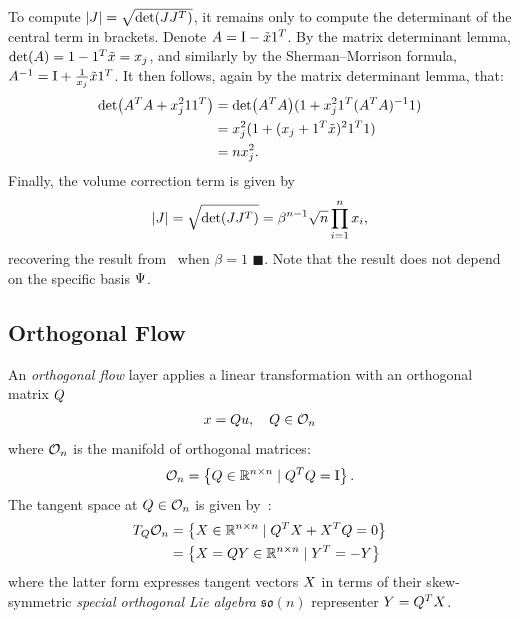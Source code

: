 To compute $\AbsDet{\vv{J}} = \sqrt{\Det{\vv{J} \vv{J}^T}}$, it remains only to compute the determinant of the central term in brackets.
Denote $A = \mathrm{I} - \tilde{x} \mathrm{1}^T$.
By the matrix determinant lemma, $\Det{\vv{A}} = 1 - \One^T \tilde{\vv{x}} = \vv{x}_{j}$, and similarly by the Sherman--Morrison formula, $A^{-1} = \mathrm{I} + \frac{1}{x_{j}} \tilde{x} \mathrm{1}^T$.
It then follows, again by the matrix determinant lemma, that:
\begin{align*}
    \Det{\vv{A}^T \vv{A} + \vv{x}_{j}^2 \One \One^T} & = \Det{\vv{A}^T \vv{A}} (1 + \vv{x}_{j}^2 \One^T (\vv{A}^T \vv{A})^{-1} \One) \\
                                                     & = \vv{x}_{j}^2 (1 + (\vv{x}_{j} + \One^T \tilde{\vv{x}})^2 \One^T \One)       \\
                                                     & = n \vv{x}_{j}^2.
\end{align*}
Finally, the volume correction term is given by
\begin{align}
    \AbsDet{\vv{J}}
    = \sqrt{\Det{\vv{J} \vv{J}^T}}
    = \beta^{n-1} \sqrt{n} \prod_{i=1}^{n} \vv{x}_{i},
\end{align}
recovering the result from~\citep{figueras_distributions_2003} when $\beta=1$ $\blacksquare$.
Note that the result does not depend on the specific basis $\Psi$.

\subsection{Orthogonal Flow}

An \textit{orthogonal flow} layer applies a linear transformation with an orthogonal matrix $Q$~\citep{hoogeboom_emerging_2019}
\begin{align*}
    x = Q u, \quad Q \in \mathcal{O}_{n}
\end{align*}
where $\mathcal{O}_{n}$ is the manifold of orthogonal matrices:
\begin{align*}
    \mathcal{O}_{n} = \left\{ Q \in \mathbb{R}^{n \times n} \mid Q^T Q = \mathrm{I} \right\}.
\end{align*}
The tangent space at $Q \in \mathcal{O}_{n}$ is given by~\citep{edelman_geometry_1998}:
\begin{align*}
    T_{Q} \mathcal{O}_{n} & = \left\{ X \in \mathbb{R}^{n \times n} \mid Q^T X + X^T Q = \mathrm{0} \right\} \\
                         & = \left\{ X = Q Y \in \mathbb{R}^{n \times n} \mid Y^T = -Y \right\}
\end{align*}
where the latter form expresses tangent vectors $X$ in terms of their skew-symmetric \textit{special orthogonal Lie algebra} $\mathfrak{so}(n)$ representer $Y = Q^T X$.

